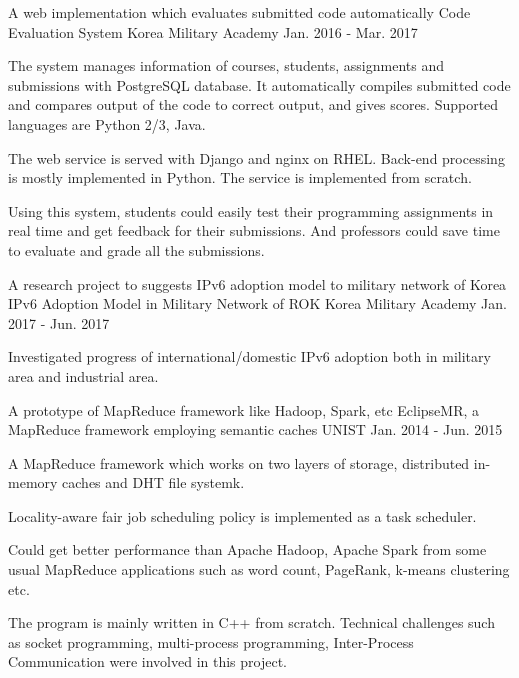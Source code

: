 \begin{cventries}
\cventry
{A web implementation which evaluates submitted code automatically} %
{Code Evaluation System} %
{Korea Military Academy} %
{Jan. 2016 - Mar. 2017} %
{ %
\begin{cvitems}
\item {The system manages information of courses, students, assignments and submissions
with PostgreSQL database. It automatically \newline compiles submitted code and compares output
of the code to correct output, and gives scores. Supported languages are Python 2/3, Java.}
\item {The web service is served with Django and nginx on RHEL. Back-end processing is mostly implemented in Python.
The service is implemented from scratch.}
\item {Using this system, students could easily test their programming assignments in real time
and get feedback for their submissions. And professors could save time to evaluate and grade all the submissions.}
\end{cvitems}
}


\cventry
{A research project to suggests IPv6 adoption model to military network of Korea} %
{IPv6 Adoption Model in Military Network of ROK} %
{Korea Military Academy} %
{Jan. 2017 - Jun. 2017} %
{ %
\begin{cvitems}
\item {Investigated progress of international/domestic IPv6 adoption both in military
area and industrial area.}
\end{cvitems}
}


\cventry
{A prototype of MapReduce framework like Hadoop, Spark, etc} %
{EclipseMR, a MapReduce framework employing semantic caches} %
{UNIST} %
{Jan. 2014 - Jun. 2015} %
{ %
\begin{cvitems}
\item {A MapReduce framework which works on two layers of storage, distributed in-memory
caches and DHT file systemk.}
\item {Locality-aware fair job scheduling policy is implemented as a task scheduler.}
\item {Could get better performance than Apache Hadoop, Apache Spark from some usual
MapReduce applications such as word count, PageRank, k-means clustering etc.}
\item {The program is mainly written in C++ from scratch. Technical challenges such as socket
programming, multi-process programming, \newline Inter-Process Communication were involved
in this project.}
\end{cvitems}
}


\end{cventries}
